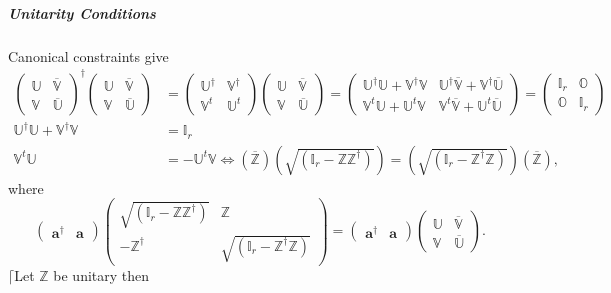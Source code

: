 \documentclass[aps, preprint]{revtex4}
\begin{document}
\subparagraph{Unitarity Conditions}
Canonical constraints give
\begin{align}\left (\begin{array}{cc}\mathbb{U} & \overline{\mathbb{V}} \\
\mathbb{V} & \overline{\mathbb{U}}\end{array}\right )^{ \dag } \left (\begin{array}{cc}\mathbb{U} & \overline{\mathbb{V}} \\
\mathbb{V} & \overline{\mathbb{U}}\end{array}\right ) &  =\left (\begin{array}{cc}\mathbb{U}^{ \dag } & \mathbb{V}^{ \dag } \\
\mathbb{V}^{t} & \mathbb{U}^{t}\end{array}\right ) \left (\begin{array}{cc}\mathbb{U} & \overline{\mathbb{V}} \\
\mathbb{V} & \overline{\mathbb{U}}\end{array}\right ) =\left (\begin{array}{cc}\mathbb{U}^{ \dag } \mathbb{U} +\mathbb{V}^{ \dag } \mathbb{V} & \mathbb{U}^{ \dag } \overline{\mathbb{V}} +\mathbb{V}^{ \dag } \overline{\mathbb{U}} \\
\mathbb{V}^{t} \mathbb{U} +\mathbb{U}^{t} \mathbb{V} & \mathbb{V}^{t} \overline{\mathbb{V}} +\mathbb{U}^{t} \overline{\mathbb{U}}\end{array}\right ) =\left (\begin{array}{cc}\mathbb{I}_{r} & \mathbb{O} \\
\mathbb{O} & \mathbb{I}_{r}\end{array}\right ) \\
\mathbb{U}^{ \dag } \mathbb{U} +\mathbb{V}^{ \dag } \mathbb{V} &  =\mathbb{I}_{r} \\
\mathbb{V}^{t} \mathbb{U} &  = -\mathbb{U}^{t} \mathbb{V} \Leftrightarrow \left (\overline{\mathbb{Z}}\right ) \left (\sqrt{\left (\mathbb{I}_{r} -\mathbb{Z} \mathbb{Z}^{ \dag }\right )}\right ) =\left (\sqrt{\left (\mathbb{I}_{r} -\mathbb{Z}^{ \dag } \mathbb{Z}\right )}\right ) \left (\overline{\mathbb{Z}}\right )\text{,}\end{align}where
\begin{equation}\left (\begin{array}{cc}\mathbf{a}^{ \dag } & \mathbf{a}\end{array}\right ) \left (\begin{array}{cc}\sqrt{\left (\mathbb{I}_{r} -\mathbb{Z} \mathbb{Z}^{ \dag }\right )} & \mathbb{Z} \\
 -\mathbb{Z}^{ \dag } & \sqrt{\left (\mathbb{I}_{r} -\mathbb{Z}^{ \dag } \mathbb{Z}\right )}\end{array}\right ) =\left (\begin{array}{cc}\mathbf{a}^{ \dag } & \mathbf{a}\end{array}\right ) \left (\begin{array}{cc}\mathbb{U} & \overline{\mathbb{V}} \\
\mathbb{V} & \overline{\mathbb{U}}\end{array}\right )\text{.}
\end{equation}$\lceil $Let $\mathbb{Z}$ be unitary then
\end{document}

